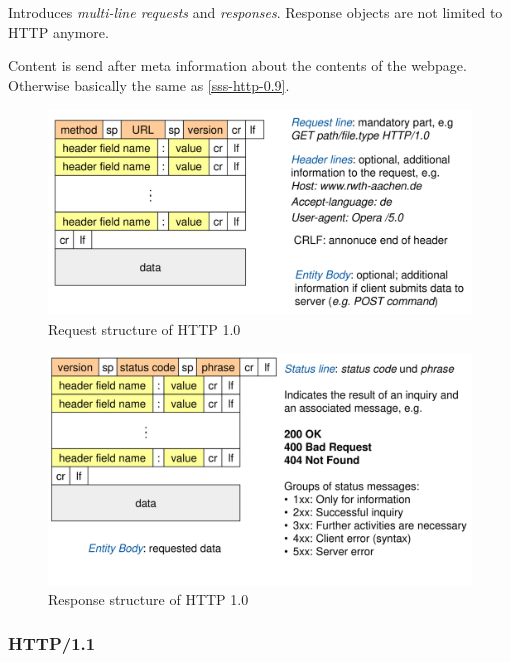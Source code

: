 \documentclass[english]{panikzettel}
\begin{document}
	Introduces \textit{multi-line requests} and \textit{responses}. Response objects are not limited to HTTP anymore.
	
	Content is send after meta information about the contents of the webpage.
	Otherwise basically the same as \cref{sss-http-0.9}. 

	\begin{halfboxl}
		\begin{figure}[H]
			\centering
			\includegraphics[width=\textwidth]{img/2-http-10-requests.png}
			\caption{Request structure of HTTP 1.0}
			\label{img-2-http-10-requests}
		\end{figure}	
	\end{halfboxl}%
	\begin{halfboxr}
		\begin{figure}[H]
			\centering
			\includegraphics[width=\textwidth]{img/2-http-10-response.png}
			\caption{Response structure of HTTP 1.0}
			\label{img-2-http-10-response}
		\end{figure}
	\end{halfboxr}
	
	\subsubsection{HTTP/1.1}
	\label{sss-http-1.1}
	
\end{document}
